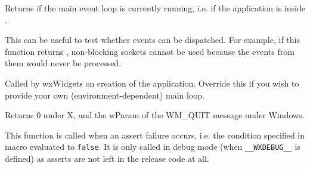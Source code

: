 Returns \true if the main event loop is currently running, i.e. if the
application is inside .

This can be useful to test whether events can be dispatched. For example,
if this function returns \false, non-blocking sockets cannot be used because
the events from them would never be processed.


\label{wxappmainloop}


Called by wxWidgets on creation of the application. Override this if you wish
to provide your own (environment-dependent) main loop.


Returns 0 under X, and the wParam of the WM\_QUIT message under Windows.



\label{wxapponassertfailure}


This function is called when an assert failure occurs, i.e. the condition
specified in  macro evaluated to {\tt false}.
It is only called in debug mode (when {\tt \_\_WXDEBUG\_\_} is defined) as
asserts are not left in the release code at all.

